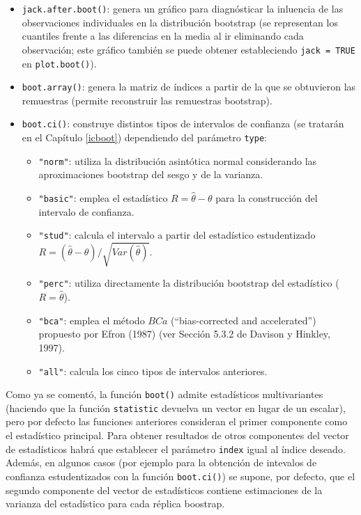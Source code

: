 \documentclass[
]{book}
\theoremstyle{break}
\theoremstyle{nonumberplain}
\begin{document}
\begin{itemize}
\item
  \texttt{jack.after.boot()}: genera un gráfico para diagnósticar la inluencia
  de las observaciones individuales en la distribución bootstrap
  (se representan los cuantiles frente a las diferencias en la media
  al ir eliminando cada observación; este gráfico también se puede obtener
  estableciendo \texttt{jack\ =\ TRUE} en \texttt{plot.boot()}).
\item
  \texttt{boot.array()}: genera la matriz de índices a partir de la que se obtuvieron las remuestras (permite reconstruir las remuestras bootstrap).
\item
  \texttt{boot.ci()}: construye distintos tipos de intervalos de confianza
  (se tratarán en el Capítulo \ref{icboot}) dependiendo del parámetro \texttt{type}:

  \begin{itemize}
  \item
    \texttt{"norm"}: utiliza la distribución asintótica normal considerando las
    aproximaciones bootstrap del sesgo y de la varianza.
  \item
    \texttt{"basic"}: emplea el estadístico \(R = \hat \theta - \theta\) para la
    construcción del intervalo de confianza.
  \item
    \texttt{"stud"}: calcula el intervalo a partir del estadístico estudentizado
    \(R = \left( \hat \theta - \theta \right) / \sqrt{Var(\hat \theta)}\).
  \item
    \texttt{"perc"}: utiliza directamente la distribución bootstrap del estadístico
    (\(R = \hat \theta\)).
  \item
    \texttt{"bca"}: emplea el método \(BCa\) (``bias-corrected and accelerated'')
    propuesto por Efron (1987) (ver Sección 5.3.2 de Davison y Hinkley, 1997).
  \item
    \texttt{"all"}: calcula los cinco tipos de intervalos anteriores.
  \end{itemize}
\end{itemize}

Como ya se comentó, la función \texttt{boot()} admite estadísticos multivariantes
(haciendo que la función \texttt{statistic} devuelva un vector en lugar de un escalar),
pero por defecto las funciones anteriores consideran el primer componente
como el estadístico principal.
Para obtener resultados de otros componentes del vector de estadísticos
habrá que establecer el parámetro \texttt{index} igual al índice deseado.
Además, en algunos casos (por ejemplo para la obtención de intevalos de confianza
estudentizados con la función \texttt{boot.ci()}) se supone, por defecto, que el segundo
componente del vector de estadísticos contiene estimaciones de la varianza del
estadístico para cada réplica boostrap.
\end{document}
